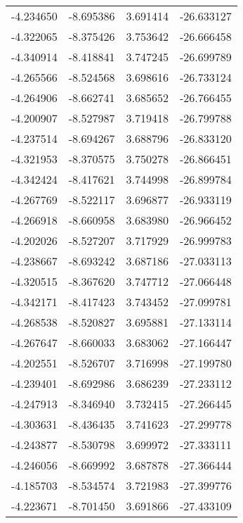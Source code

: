 \begin{tabular}{rrrr}
       -4.234650 &        -8.695386 &    3.691414 & -26.633127 \\
       -4.322065 &        -8.375426 &    3.753642 & -26.666458 \\
       -4.340914 &        -8.418841 &    3.747245 & -26.699789 \\
       -4.265566 &        -8.524568 &    3.698616 & -26.733124 \\
       -4.264906 &        -8.662741 &    3.685652 & -26.766455 \\
       -4.200907 &        -8.527987 &    3.719418 & -26.799788 \\
       -4.237514 &        -8.694267 &    3.688796 & -26.833120 \\
       -4.321953 &        -8.370575 &    3.750278 & -26.866451 \\
       -4.342424 &        -8.417621 &    3.744998 & -26.899784 \\
       -4.267769 &        -8.522117 &    3.696877 & -26.933119 \\
       -4.266918 &        -8.660958 &    3.683980 & -26.966452 \\
       -4.202026 &        -8.527207 &    3.717929 & -26.999783 \\
       -4.238667 &        -8.693242 &    3.687186 & -27.033113 \\
       -4.320515 &        -8.367620 &    3.747712 & -27.066448 \\
       -4.342171 &        -8.417423 &    3.743452 & -27.099781 \\
       -4.268538 &        -8.520827 &    3.695881 & -27.133114 \\
       -4.267647 &        -8.660033 &    3.683062 & -27.166447 \\
       -4.202551 &        -8.526707 &    3.716998 & -27.199780 \\
       -4.239401 &        -8.692986 &    3.686239 & -27.233112 \\
       -4.247913 &        -8.346940 &    3.732415 & -27.266445 \\
       -4.303631 &        -8.436435 &    3.741623 & -27.299778 \\
       -4.243877 &        -8.530798 &    3.699972 & -27.333111 \\
       -4.246056 &        -8.669992 &    3.687878 & -27.366444 \\
       -4.185703 &        -8.534574 &    3.721983 & -27.399776 \\
       -4.223671 &        -8.701450 &    3.691866 & -27.433109 \\

\end{tabular}
